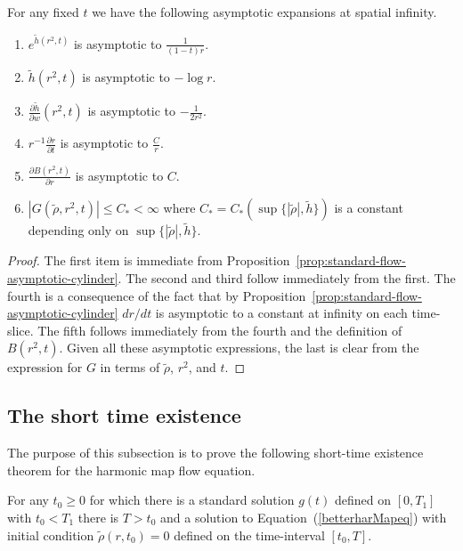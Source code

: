 \begin{claim}
\label{claim:harmonic-map-flow-asymptotics}
\label{asympt}
For any fixed $t$ we have the following asymptotic expansions at
spatial infinity.
\begin{enumerate}
\item[(1)]
 $e^{\tilde{h}(r^2,t)}$ is asymptotic to $\frac{1}{(1-t)r}$.
\item[(2)] $\tilde{h}(r^2,t)$ is asymptotic to $-\log r$.
\item[(3)] $\frac{\partial \tilde{h}}{\partial w}(r^2,t)$ is asymptotic to
 $-\frac{1}{2r^2}$.
\item[(4)]  $r^{-1} \frac{\partial r}{\partial t}$ is asymptotic to
$\frac{C}{r}$.
\item[(5)] $\frac{\partial B(r^2,t)}{\partial r}$ is asymptotic to  $C$.
\item[(6)] $|G( \tilde{\rho},r^2,t)| \leq C_*< \infty$ where
$C_* =C_*\left(\sup\{|\tilde{\rho}|,\tilde{h}\}\right)$ is a
constant depending only on $\sup\{|\tilde{\rho}|,\tilde{h}\}$.
\end{enumerate}
\end{claim}


\begin{proof}
The first item is immediate from  Proposition~\ref{prop:standard-flow-asymptotic-cylinder}. The
second and third follow immediately from the first. The fourth is a
consequence of the fact that by Proposition~\ref{prop:standard-flow-asymptotic-cylinder} $dr/dt$ is
asymptotic to a constant at infinity on each time-slice. The fifth
follows immediately from the fourth and the definition of
$B(r^2,t)$. Given all these asymptotic expressions, the last is
clear from the expression for $G$ in terms of $\tilde \rho$, $r^2$,
and $t$.
\end{proof}



\subsection{The short time existence}

The purpose of this subsection is to prove the following short-time
existence theorem for the harmonic map flow equation.

\begin{proposition}
\label{prop:harmonic-map-flow-short-time-existence}
For any $t_0\ge 0$ for which there is a standard solution $g(t)$
defined on $[0,T_1]$ with $t_0<T_1$ there is $T>t_0$ and a solution
to Equation~(\ref{betterharMapeq}) with initial condition
$\tilde{\rho}(r,t_0)=0$  defined on the time-interval $[t_0,T]$.
\end{proposition}


